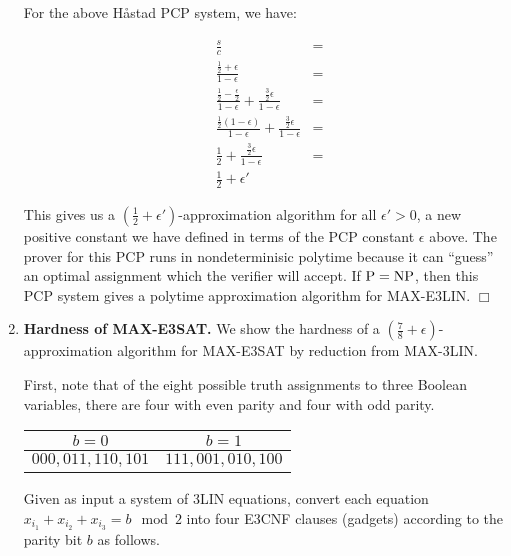 \documentclass[12pt]{article}
\begin{document}
\begin{enumerate}
For the above H\aa stad PCP system, we have:

\begin{eqnarray*}
& \displaystyle \frac{s}{c} & =\\
& \frac{\frac{1}{2}+\epsilon}{1 - \epsilon} & = \\
& \frac{\frac{1}{2} - \frac{\epsilon}{2}}{1 - \epsilon} + \frac{\frac{3}{2}\epsilon}{1 - \epsilon} & = \\
& \frac{\frac{1}{2}(1 - \epsilon)}{1 - \epsilon} + \frac{\frac{3}{2}\epsilon}{1 - \epsilon} & = \\
& \frac{1}{2} + \frac{\frac{3}{2}\epsilon}{1 - \epsilon} & =\\
& \frac{1}{2} + \epsilon' &
\end{eqnarray*}

This gives us a $(\frac{1}{2}+\epsilon')$-approximation algorithm for all
$\epsilon' > 0$, a new positive constant we have defined in terms of the
PCP constant $\epsilon$ above. The prover for this PCP runs in nondeterminisic
polytime because it can ``guess'' an optimal assignment which the verifier
will accept. If $\mathrm{P}=\mathrm{NP}$, then this PCP system gives a polytime approximation
algorithm for MAX-E3LIN.
$\Box$

\item
\textbf{Hardness of MAX-E3SAT.}
We show the
hardness of a $(\frac{7}{8}+\epsilon)$-approximation algorithm for MAX-E3SAT
by reduction from MAX-3LIN.
%

First, note that of the eight possible truth assignments to three Boolean
variables, there are four with even parity and four with odd parity.

\begin{tabular}{|c|c|}
\hline
$b=0$ & $b=1$\\
\hline
$000, 011, 110, 101$ & $111, 001, 010, 100$\\
\hline
\end{tabular}

Given as input a system of 3LIN equations, convert each equation
$x_{i_1} + x_{i_2} + x_{i_3} = b \mod 2$ into
four E3CNF clauses (gadgets) according to the parity bit $b$ as follows.


\end{enumerate}
\end{document}
